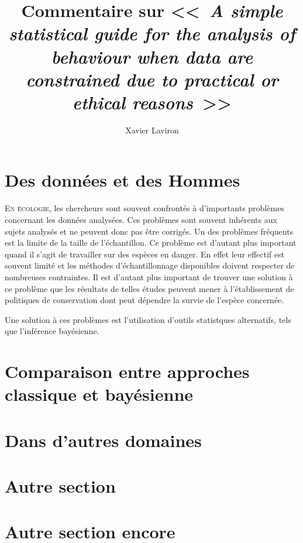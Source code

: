 \documentclass[11pt,twocolumn,twoside]{bopHomework}
\title{Commentaire sur <<~\textit{A simple statistical guide for the analysis
  of behaviour when data are constrained due to practical or ethical
  reasons}~>> \cite{garamszegi2016}
}
\author{Xavier Laviron}
\begin{document}
\maketitle


\section{Des données et des Hommes}

\lettrine{E}{n écologie}, les chercheurs sont souvent confrontés à d'importants problèmes
concernant les données analysées.
Ces problèmes sont souvent inhérents aux sujets analysés et ne peuvent donc pas
être corrigés.
Un des problèmes fréquents est la limite de la taille de l'échantillon.
Ce problème est d'autant plus important quand il s'agit de travailler sur des
espèces en danger.
En effet leur effectif est souvent limité et les méthodes d'échantillonnage
disponibles doivent respecter de nombreuses contraintes.
Il est d'autant plus important de trouver une solution à ce problème que les
résultats de telles études peuvent mener à l'établissement de politiques de
conservation dont peut dépendre la survie de l'espèce concernée.

Une solution à ces problèmes est l'utilisation d'outils statistques
alternatifs, tels que l'inférence bayésienne.

\section{Comparaison entre approches classique et bayésienne}

\lipsum[1-2]

\section{Dans d'autres domaines}

\lipsum[1-2]

\section{Autre section}

\lipsum[1-3]

\section{Autre section encore}

\lipsum[1-2]

\begin{footnotesize}
  
\end{footnotesize}
\end{document}
